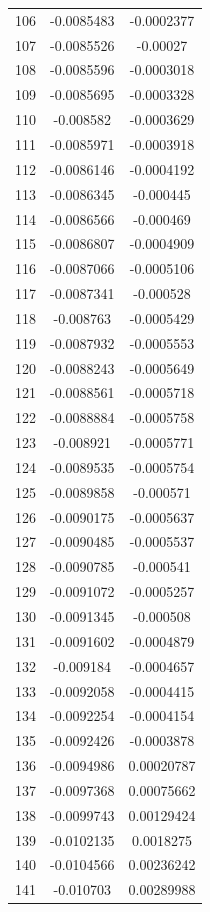 \documentclass[a4paper, 11pt, oneside]{report}
\begin{document}
{\begin{longtable}{|c|c|c|}
106 & -0.0085483 & -0.0002377 \\
107 & -0.0085526 & -0.00027   \\
108 & -0.0085596 & -0.0003018 \\
109 & -0.0085695 & -0.0003328 \\
110 & -0.008582  & -0.0003629 \\
111 & -0.0085971 & -0.0003918 \\
112 & -0.0086146 & -0.0004192 \\
113 & -0.0086345 & -0.000445  \\
114 & -0.0086566 & -0.000469  \\
115 & -0.0086807 & -0.0004909 \\
116 & -0.0087066 & -0.0005106 \\
117 & -0.0087341 & -0.000528  \\
118 & -0.008763  & -0.0005429 \\
119 & -0.0087932 & -0.0005553 \\
120 & -0.0088243 & -0.0005649 \\
121 & -0.0088561 & -0.0005718 \\
122 & -0.0088884 & -0.0005758 \\
123 & -0.008921  & -0.0005771 \\
124 & -0.0089535 & -0.0005754 \\
125 & -0.0089858 & -0.000571  \\
126 & -0.0090175 & -0.0005637 \\
127 & -0.0090485 & -0.0005537 \\
128 & -0.0090785 & -0.000541  \\
129 & -0.0091072 & -0.0005257 \\
130 & -0.0091345 & -0.000508  \\
131 & -0.0091602 & -0.0004879 \\
132 & -0.009184  & -0.0004657 \\
133 & -0.0092058 & -0.0004415 \\
134 & -0.0092254 & -0.0004154 \\
135 & -0.0092426 & -0.0003878 \\
136 & -0.0094986 & 0.00020787 \\
137 & -0.0097368 & 0.00075662 \\
138 & -0.0099743 & 0.00129424 \\
139 & -0.0102135 & 0.0018275  \\
140 & -0.0104566 & 0.00236242 \\
141 & -0.010703  & 0.00289988 \\

\end{longtable}}
\end{document}
